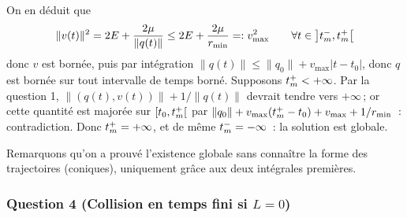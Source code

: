 On en déduit que \[
\|v(t)\|^2 = 2E + \frac{2\mu}{\|q(t)\|} \leq 2E + \frac{2\mu}{r_{\min}} =: v_{\max}^2 \qquad \forall t\in\left]t_m^-,t_m^+\right[
\] donc \(v\) est bornée, puis par intégration
\(\|q(t)\|\leq \|q_0\| + v_{\max}|t-t_0|\), donc \(q\) est bornée sur
tout intervalle de temps borné. Supposons \(t_m^+<+\infty\). Par la
question 1, \(\|(q(t),v(t))\| + 1/\|q(t)\|\) devrait tendre vers
\(+\infty\)\,; or cette quantité est majorée sur \(\left[t_0,t_m^+\right[\)
par \(\|q_0\| + v_{\max}(t_m^+-t_0) + v_{\max} + 1/r_{\min}\)~:
contradiction. Donc \(t_m^+=+\infty\), et de même
\(t_m^-=-\infty\)~: la solution est globale.

Remarquons qu'on a prouvé l'existence globale sans connaître la forme des
trajectoires (coniques), uniquement grâce aux deux intégrales premières.

\hypertarget{answer-kepler-4}{%
\subsubsection*{Question 4 (Collision en temps fini si
\texorpdfstring{\(L=0\)}{L nul})}\label{answer-kepler-4}}


